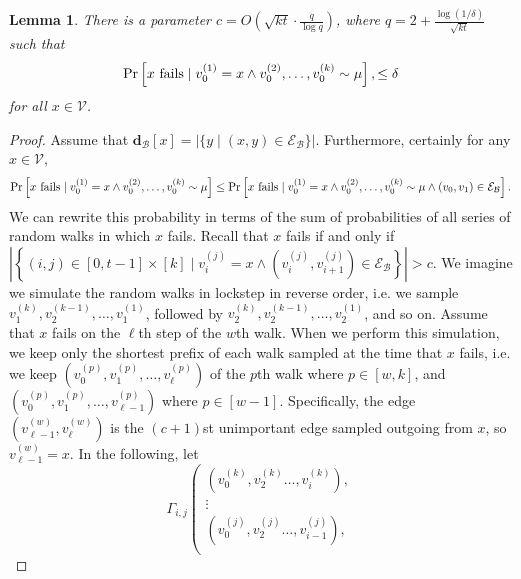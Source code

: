 \documentclass[10]{report}
\newtheorem{lemma}[theorem]{Lemma}
\begin{document}
\begin{lemma} \label{lem:rw:setc}
There is a parameter $c = O\left (\sqrt{kt} \cdot \frac{q}{\log q} \right )$, where $q = 2 + \frac{\log(1/\delta)}{\sqrt{kt}}$ such that 
%
\begin{equation*}
\Pr \left [\textnormal{$x$ fails} \mid v_0^{(1)} = x \wedge v_0^{(2)}, \dots, v_0^{(k)} \sim \mu \right ], \leq \delta
\end{equation*}
%
for all $x \in \mathcal{V}$.
\end{lemma}
%
\begin{proof}
Assume that $\mathbf{d}_\mathcal{B}[x] = |\{y \mid (x, y) \in \mathcal{E}_\mathcal{B}\}|$.
Furthermore, certainly for any $x \in \mathcal{V}$,
%
\begin{equation*}
\Pr \left [\textnormal{$x$ fails} \mid v_0^{(1)} = x \wedge v_0^{(2)}, \dots, v_0^{(k)} \sim \mu \right ]
\leq 
\Pr \left [\textnormal{$x$ fails} \mid v_0^{(1)} = x \wedge v_0^{(2)}, \dots, v_0^{(k)} \sim \mu \wedge (v_0, v_1) \in \mathcal{E}_\mathcal{B} \right ].
\end{equation*}
%
We can rewrite this probability in terms of the sum of probabilities of all series of random walks in which $x$ fails.  
Recall that $x$ fails if and only if 
$\left | \left \{ (i,j) \in [0, t - 1] \times [k] \mid v_i^{(j)} = x 
	\wedge \left ( v_i^{(j)}, v_{i+1}^{(j)} \right ) \in \mathcal{E}_\mathcal{B} \right \} \right | > c$.
We imagine we simulate the random walks in lockstep in reverse order, i.e. we sample $v_1^{(k)}, v_2^{(k-1)}, \dots, v_1^{(1)}$, followed by $v_2^{(k)}, v_2^{(k-1)}, \dots, v_2^{(1)}$, and so on.
Assume that $x$ fails on the $\ell$th step of the $w$th walk.
When we perform this simulation, we keep only the shortest prefix of each walk sampled at the time that $x$ fails, i.e. we keep $\left (v_0^{(p)}, v_1^{(p)},  \dots, v_\ell^{(p)} \right )$ of the $p$th walk where $p \in [w, k]$, and $\left (v_0^{(p)}, v_1^{(p)},  \dots, v_{\ell-1}^{(p)} \right )$ where $p \in [w-1]$. 
Specifically, the edge $\left ( v_{\ell-1}^{(w)}, v_{\ell}^{(w)} \right )$ is the $(c+1)$st unimportant edge sampled outgoing from $x$, so $v_{\ell-1}^{(w)} = x$.
In the following, let 
%
\begin{equation} \label{eq:rw:gamma}
\Gamma_{i, j} \left ( {\substack{
	\left (v_0^{(k)}, v_2^{(k)} \dots, v_i^{(k)} \right ), \\
	\vdots \\
	\left (v_0^{(j)}, v_2^{(j)} \dots, v_{i-1}^{(j)} \right ), \\
}}
\end{equation}
\end{proof}
\end{document}
